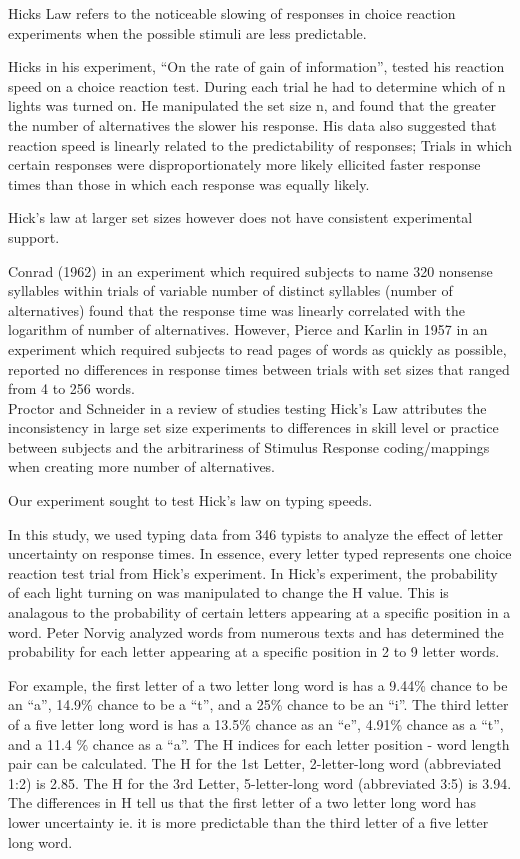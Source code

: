 \documentclass[floatsintext,man]{apa6}
\theoremstyle{definition}
\theoremstyle{definition}
\theoremstyle{definition}
\theoremstyle{remark}
\begin{document}
Hicks Law refers to the noticeable slowing of responses in choice
reaction experiments when the possible stimuli are less predictable.

Hicks in his experiment, \enquote{On the rate of gain of information},
tested his reaction speed on a choice reaction test. During each trial
he had to determine which of n lights was turned on. He manipulated the
set size n, and found that the greater the number of alternatives the
slower his response. His data also suggested that reaction speed is
linearly related to the predictability of responses; Trials in which
certain responses were disproportionately more likely ellicited faster
response times than those in which each response was equally likely.

Hick's law at larger set sizes however does not have consistent
experimental support.

Conrad (1962) in an experiment which required subjects to name 320
nonsense syllables within trials of variable number of distinct
syllables (number of alternatives) found that the response time was
linearly correlated with the logarithm of number of alternatives.
However, Pierce and Karlin in 1957 in an experiment which required
subjects to read pages of words as quickly as possible, reported no
differences in response times between trials with set sizes that ranged
from 4 to 256 words.\\
Proctor and Schneider in a review of studies testing Hick's Law
attributes the inconsistency in large set size experiments to
differences in skill level or practice between subjects and the
arbitrariness of Stimulus Response coding/mappings when creating more
number of alternatives.

Our experiment sought to test Hick's law on typing speeds.

In this study, we used typing data from 346 typists to analyze the
effect of letter uncertainty on response times. In essence, every letter
typed represents one choice reaction test trial from Hick's experiment.
In Hick's experiment, the probability of each light turning on was
manipulated to change the H value. This is analagous to the probability
of certain letters appearing at a specific position in a word. Peter
Norvig analyzed words from numerous texts and has determined the
probability for each letter appearing at a specific position in 2 to 9
letter words.

For example, the first letter of a two letter long word is has a 9.44\%
chance to be an \enquote{a}, 14.9\% chance to be a \enquote{t}, and a
25\% chance to be an \enquote{i}. The third letter of a five letter long
word is has a 13.5\% chance as an \enquote{e}, 4.91\% chance as a
\enquote{t}, and a 11.4 \% chance as a \enquote{a}. The H indices for
each letter position - word length pair can be calculated. The H for the
1st Letter, 2-letter-long word (abbreviated 1:2) is 2.85. The H for the
3rd Letter, 5-letter-long word (abbreviated 3:5) is 3.94. The
differences in H tell us that the first letter of a two letter long word
has lower uncertainty ie. it is more predictable than the third letter
of a five letter long word.
\end{document}
